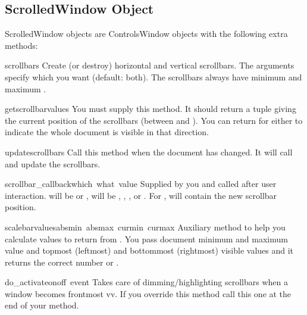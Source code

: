 \subsection{ScrolledWindow Object}

ScrolledWindow objects are ControlsWindow objects with the following
extra methods:

\renewcommand{\indexsubitem}{(ScrolledWindow method)}

\begin{funcdesc}{scrollbars}{}
Create (or destroy) horizontal and vertical scrollbars. The arguments
specify which you want (default: both). The scrollbars always have
minimum  and maximum .
\end{funcdesc}

\begin{funcdesc}{getscrollbarvalues}{}
You must supply this method. It should return a tuple 
giving the current position of the scrollbars (between  and
). You can return  for either to indicate the
whole document is visible in that direction.
\end{funcdesc}

\begin{funcdesc}{updatescrollbars}{}
Call this method when the document has changed. It will call
 and update the scrollbars.
\end{funcdesc}

\begin{funcdesc}{scrollbar_callback}{which\, what\, value}
Supplied by you and called after user interaction.  will
be  or ,  will be ,
, ,  or . For
,  will contain the new scrollbar position.
\end{funcdesc}

\begin{funcdesc}{scalebarvalues}{absmin\, absmax\, curmin\, curmax}
Auxiliary method to help you calculate values to return from
. You pass document minimum and maximum value
and topmost (leftmost) and bottommost (rightmost) visible values and
it returns the correct number or .
\end{funcdesc}

\begin{funcdesc}{do_activate}{onoff\, event}
Takes care of dimming/highlighting scrollbars when a window becomes
frontmost vv. If you override this method call this one at the end of
your method.
\end{funcdesc}

